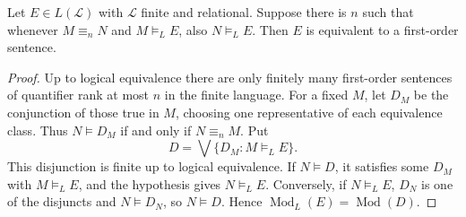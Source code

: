 \begin{lemma}
Let $E\in L(\mathcal L)$ with $\mathcal L$ finite and relational.
Suppose there is $n$ such that whenever $M\equiv_nN$ and
$M\models_LE$, also $N\models_LE$. Then $E$ is equivalent to a
first-order sentence.
\end{lemma}
\begin{proof}
Up to logical equivalence there are only finitely many first-order
sentences of quantifier rank at most $n$ in the finite language.
For a fixed $M$, let $D_M$ be the conjunction of those true in $M$,
choosing one representative of each equivalence class. Thus
$N\models D_M$ if and only if $N\equiv_nM$.
Put
\[
D=\bigvee\{D_M:M\models_LE\}.
\]
This disjunction is finite up to logical equivalence.
If $N\models D$, it satisfies some $D_M$ with $M\models_LE$, and the
hypothesis gives $N\models_LE$. Conversely, if $N\models_LE$,
$D_N$ is one of the disjuncts and $N\models D_N$, so $N\models D$.
Hence $\operatorname{Mod}_L(E)=\operatorname{Mod}(D)$.
\end{proof}

